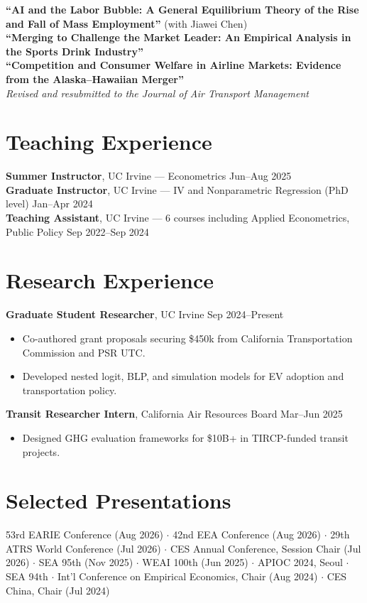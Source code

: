 \documentclass[11pt,letterpaper]{article}
\begin{document}
\textbf{``AI and the Labor Bubble: A General Equilibrium Theory of the Rise and Fall of Mass Employment''} (with Jiawei Chen)\\[2pt]
\textbf{``Merging to Challenge the Market Leader: An Empirical Analysis in the Sports Drink Industry''}\\[2pt]
\textbf{``Competition and Consumer Welfare in Airline Markets: Evidence from the Alaska--Hawaiian Merger''}\\
\quad\textit{Revised and resubmitted to the Journal of Air Transport Management}

\section{Teaching Experience}
\textbf{Summer Instructor}, UC Irvine --- Econometrics \hfill Jun--Aug 2025\\
\textbf{Graduate Instructor}, UC Irvine --- IV and Nonparametric Regression (PhD level) \hfill Jan--Apr 2024\\
\textbf{Teaching Assistant}, UC Irvine --- 6 courses including Applied Econometrics, Public Policy \hfill Sep 2022--Sep 2024

\section{Research Experience}
\textbf{Graduate Student Researcher}, UC Irvine \hfill Sep 2024--Present
\begin{itemize}[nosep,leftmargin=1.5em,topsep=2pt]
  \item Co-authored grant proposals securing \$450k from California Transportation Commission and PSR UTC.
  \item Developed nested logit, BLP, and simulation models for EV adoption and transportation policy.
\end{itemize}
\textbf{Transit Researcher Intern}, California Air Resources Board \hfill Mar--Jun 2025
\begin{itemize}[nosep,leftmargin=1.5em,topsep=2pt]
  \item Designed GHG evaluation frameworks for \$10B+ in TIRCP-funded transit projects.
\end{itemize}

\section{Selected Presentations}
53rd EARIE Conference (Aug 2026) $\cdot$ 42nd EEA Conference (Aug 2026) $\cdot$ 29th ATRS World Conference (Jul 2026) $\cdot$ CES Annual Conference, Session Chair (Jul 2026) $\cdot$ SEA 95th (Nov 2025) $\cdot$ WEAI 100th (Jun 2025) $\cdot$ APIOC 2024, Seoul $\cdot$ SEA 94th $\cdot$ Int'l Conference on Empirical Economics, Chair (Aug 2024) $\cdot$ CES China, Chair (Jul 2024)
\end{document}
